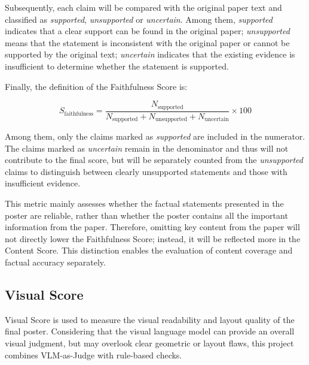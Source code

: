 \documentclass[12pt,oneside]{report}
\begin{document}
\vspace{1em}

Subsequently, each claim will be compared with the original paper text and classified as \textit{supported}, \textit{unsupported} or \textit{uncertain}. Among them, \textit{supported} indicates that a clear support can be found in the original paper; \textit{unsupported} means that the statement is inconsistent with the original paper or cannot be supported by the original text; \textit{uncertain} indicates that the existing evidence is insufficient to determine whether the statement is supported.

\vspace{1em}

Finally, the definition of the Faithfulness Score is:

\[
S_{\mathrm{faithfulness}}
=
\frac{
N_{\mathrm{supported}}
}{
N_{\mathrm{supported}}
+
N_{\mathrm{unsupported}}
+
N_{\mathrm{uncertain}}
}
\times 100
\]

Among them, only the claims marked as \textit{supported} are included in the numerator. The claims marked as \textit{uncertain} remain in the denominator and thus will not contribute to the final score, but will be separately counted from the \textit{unsupported} claims to distinguish between clearly unsupported statements and those with insufficient evidence.

\vspace{1em}

This metric mainly assesses whether the factual statements presented in the poster are reliable, rather than whether the poster contains all the important information from the paper. Therefore, omitting key content from the paper will not directly lower the Faithfulness Score; instead, it will be reflected more in the Content Score. This distinction enables the evaluation of content coverage and factual accuracy separately.

\subsection{Visual Score}

Visual Score is used to measure the visual readability and layout quality of the final poster. Considering that the visual language model can provide an overall visual judgment, but may overlook clear geometric or layout flaws, this project combines VLM-as-Judge with rule-based checks.

\vspace{1em}
\end{document}
